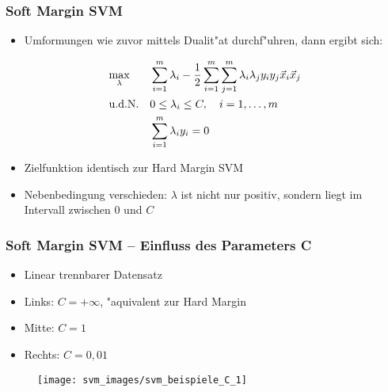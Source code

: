 
\begin{frame}

\frametitle{Soft Margin SVM}

\begin{itemize}
	\item Umformungen wie zuvor mittels Dualit"at durchf"uhren, dann ergibt sich:
\end{itemize}

\begin{equation}
	\begin{aligned}
		& \underset{\lambda}{\max} && \sum\limits_{i=1}^m \lambda_i - \frac{1}{2} \sum\limits_{i=1}^m \sum\limits_{j=1}^m \lambda_i \lambda_j y_i y_j \vec{x}_i \vec{x}_j \notag \\
		& \textrm{u.d.N.}         && 0 \leq \lambda_i \leq C, \quad i=1,\ldots,m \\
		&						  && \sum\limits_{i=1}^m \lambda_i y_i = 0
	\end{aligned}
\end{equation}

\begin{itemize}
	\setlength{\itemsep}{15pt}
	\item Zielfunktion identisch zur Hard Margin SVM
	\item Nebenbedingung verschieden: $\lambda$ ist nicht nur positiv, sondern liegt im Intervall zwischen $0$ und $C$
\end{itemize}

\end{frame}









\begin{frame}

\frametitle{Soft Margin SVM -- Einfluss des Parameters C}

\begin{itemize}
	\setlength{\itemsep}{10pt}
	\item Linear trennbarer Datensatz
	\item Links: $C=+\infty$, "aquivalent zur Hard Margin
	\item Mitte: $C=1$ 
	\item Rechts: $C=0,01$
\end{itemize}

\begin{figure}[h]
\centering
\texttt{[image: svm\_images/svm\_beispiele\_C\_1]}
\end{figure}

\end{frame}





